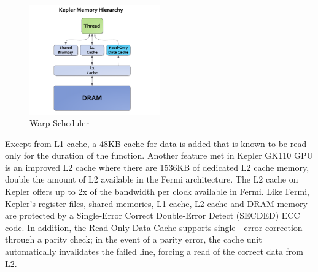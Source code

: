 \begin{figure}[h]
   \centering
       \includegraphics[width=0.5\textwidth]{memory_hieranchy}
   \caption{Warp Scheduler}
   \label{fig:memory hieranchy}
\end{figure}

Except from L1 cache, a 48KB cache for data is added that is known to be read‐only for the duration of the function. Another feature met in Kepler GK110 GPU is an improved L2 cache where there are 1536KB of dedicated L2 cache memory, double the amount of L2 available in the Fermi architecture. The L2 cache on Kepler offers up to 2x of the bandwidth per clock available in Fermi. Like Fermi, Kepler’s register files, shared memories, L1 cache, L2 cache and DRAM memory are protected by a Single‐Error Correct Double‐Error Detect (SECDED) ECC code. In addition, the Read‐Only Data Cache supports single - error correction through a parity check; in the event of a parity error, the cache unit automatically invalidates the failed line, forcing a read of the correct data from L2.




